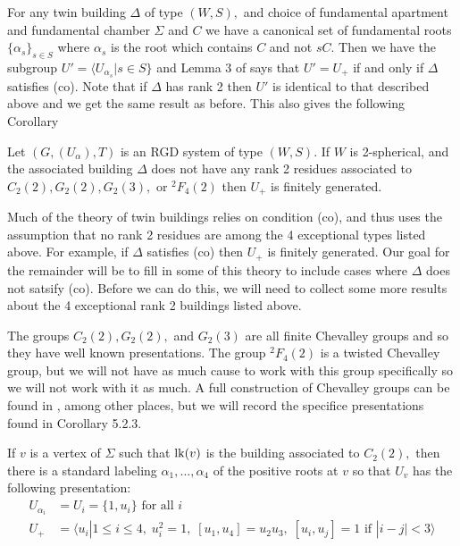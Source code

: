\documentclass[class=book, crop=false,12 pt]{standalone}
\begin{document}
For any twin building $\Delta$ of type $(W,S),$ and choice of fundamental apartment and fundamental chamber $\Sigma$ and $C$ we have a canonical set of fundamental roots $\{\alpha_s\}_{s\in S}$ where $\alpha_s$ is the root which contains $C$ and not $sC.$ Then we have the subgroup $U'=\langle U_{\alpha_s}|s\in S\}$ and Lemma 3 of \cite{cop} says that $U'=U_+$ if and only if $\Delta$ satisfies (co). Note that if $\Delta$ has rank 2 then $U'$ is identical to that described above and we get the same result as before. This also gives the following Corollary

\begin{cor}
	\label{cor:cofg}
	Let $(G,(U_\alpha),T)$ is an RGD system of type $(W,S).$ If $W$ is 2-spherical, and the associated building $\Delta$ does not have any rank 2 residues associated to $C_2(2),G_2(2),G_2(3),$ or ${}^2F_4(2)$ then $U_+$ is finitely generated.
\end{cor}

Much of the theory of twin buildings relies on condition (co), and thus uses the assumption that no rank 2 residues are among the 4 exceptional types listed above. For example, if $\Delta$ satisfies (co) then $U_+$ is finitely generated. Our goal for the remainder will be to fill in some of this theory to include cases where $\Delta$ does not satsify (co). Before we can do this, we will need to collect some more results about the 4 exceptional rank 2 buildings listed above.

The groups $C_2(2),G_2(2),$ and $G_2(3)$ are all finite Chevalley groups and so they have well known presentations. The group ${}^2F_4(2)$ is a twisted Chevalley group, but we will not have as much cause to work with this group specifically so we will not work with it as much. A full construction of Chevalley groups can be found in \cite{carter}, among other places, but we will record the specifice presentations found in Corollary 5.2.3.

\begin{lemma}
	\label{lem:c22pres}
	If $v$ is a vertex of $\Sigma$ such that $\mathrm{lk}(v)$ is the building associated to $C_2(2),$ then there is a standard labeling $\alpha_1,\dots,\alpha_4$ of the positive roots at $v$ so that $U_v$ has the following presentation:
	\begin{align*}
		U_{\alpha_i}&=U_i=\{1,u_i\}\text{ for all }i\\
		U_+&=\langle u_i|1\le i\le 4,\;u_i^2=1,\;[u_1,u_4]=u_2u_3,\;[u_i,u_j]=1\text{ if }|i-j|<3\rangle
	\end{align*}
\end{lemma}
\end{document}
